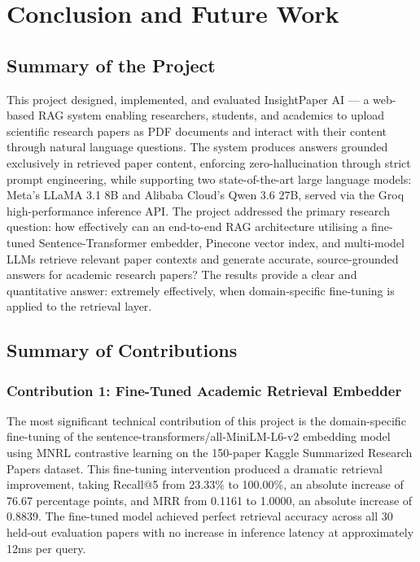 \chapter{Conclusion and Future Work}

\section{Summary of the Project}

This project designed, implemented, and evaluated InsightPaper AI — a web-based RAG system enabling researchers, students, and academics to upload scientific research papers as PDF documents and interact with their content through natural language questions. The system produces answers grounded exclusively in retrieved paper content, enforcing zero-hallucination through strict prompt engineering, while supporting two state-of-the-art large language models: Meta's LLaMA 3.1 8B and Alibaba Cloud's Qwen 3.6 27B, served via the Groq high-performance inference API.
\newline \newline The project addressed the primary research question: how effectively can an end-to-end RAG architecture utilising a fine-tuned Sentence-Transformer embedder, Pinecone vector index, and multi-model LLMs retrieve relevant paper contexts and generate accurate, source-grounded answers for academic research papers? The results provide a clear and quantitative answer: extremely effectively, when domain-specific fine-tuning is applied to the retrieval layer.

\section{Summary of Contributions}

\subsection{Contribution 1: Fine-Tuned Academic Retrieval Embedder}

The most significant technical contribution of this project is the domain-specific fine-tuning of the sentence-transformers/all-MiniLM-L6-v2 embedding model using MNRL contrastive learning on the 150-paper Kaggle Summarized Research Papers dataset. This fine-tuning intervention produced a dramatic retrieval improvement, taking Recall@5 from 23.33\% to 100.00\%, an absolute increase of 76.67 percentage points, and MRR from 0.1161 to 1.0000, an absolute increase of 0.8839. The fine-tuned model achieved perfect retrieval accuracy across all 30 held-out evaluation papers with no increase in inference latency at approximately 12ms per query.

